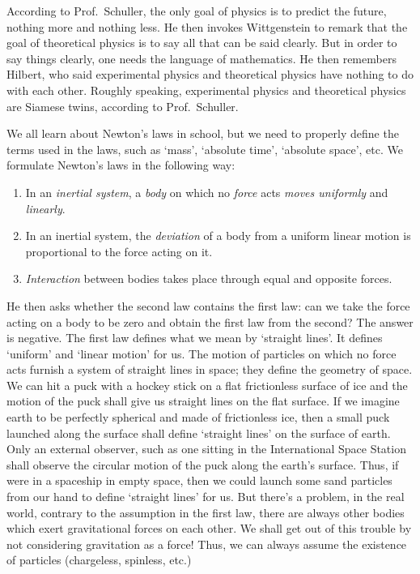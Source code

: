 \documentclass[a4 paper, 12pt]{book}
\theoremstyle{definition}
\begin{document}
    According to Prof.\ Schuller, the only goal of physics is to predict the future, nothing more and nothing less. He then invokes Wittgenstein to remark that the goal of theoretical physics is to say all that can be said clearly. But in order to say things clearly, one needs the language of mathematics. He then remembers Hilbert, who said experimental physics and theoretical physics have nothing to do with each other. Roughly speaking, experimental physics and theoretical physics are Siamese twins, according to Prof.\ Schuller.

    We all learn about Newton's laws in school, but we need to properly define the terms used in the laws, such as `mass', `absolute time', `absolute space', etc. We formulate Newton's laws in the following way:
    \begin{enumerate}
        \item In an \textit{inertial system}, a \textit{body} on which no \textit{force} acts \textit{moves uniformly} and \textit{linearly}.
        \item In an inertial system, the \textit{deviation} of a body from a uniform linear motion is proportional to the force acting on it.
        \item \textit{Interaction} between bodies takes place through equal and opposite forces.
    \end{enumerate}
    He then asks whether the second law contains the first law: can we take the force acting on a body to be zero and obtain the first law from the second? The answer is negative. The first law defines what we mean by `straight lines'. It defines `uniform' and `linear motion' for us. The motion of particles on which no force acts furnish a system of straight lines in space; they define the geometry of space. We  can hit a puck with a hockey stick on a flat frictionless surface of ice and the motion of the puck shall give us straight lines on the flat surface. If we imagine earth to be perfectly spherical and made of frictionless ice, then a small puck launched along the surface shall define `straight lines' on the surface of earth. Only an external observer, such as one sitting in the International Space Station shall observe the circular motion of the puck along the earth's surface. Thus, if were in a spaceship in empty space, then we could launch some sand particles from our hand to define `straight lines' for us. But there's a problem, in the real world, contrary to the assumption in the first law, there are always other bodies which exert gravitational forces on each other. We shall get out of this trouble by not considering gravitation as a force! Thus, we can always assume the existence of particles (chargeless, spinless, etc.)
\end{document}
